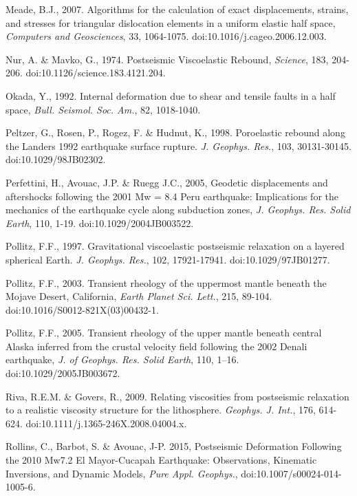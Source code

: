 \documentclass[extra,mreferee]{gji}
\begin{document}
\begin{thebibliography}{}
 Meade, B.J., 2007. Algorithms for the
  calculation of exact displacements, strains, and stresses for
  triangular dislocation elements in a uniform elastic half space,
  \textit{Computers and Geosciences}, 33,
  1064-1075. doi:10.1016/j.cageo.2006.12.003.

 Nur, A. \& Mavko, G.,
  1974. Postseismic Viscoelastic Rebound, \textit{Science}, 183,
  204-206. doi:10.1126/science.183.4121.204.

 Okada, Y., 1992. Internal
  deformation due to shear and tensile faults in a half space,
  \textit{Bull. Seismol. Soc.  Am.}, 82, 1018-1040.

 Peltzer, G., Rosen, P.,
  Rogez, F. \& Hudnut, K., 1998. Poroelastic rebound along the Landers
  1992 earthquake surface rupture. \textit{J. Geophys. Res.}, 103,
  30131-30145. doi:10.1029/98JB02302.

 Perfettini, H., Avouac,
  J.P. \& Ruegg J.C., 2005, Geodetic displacements and aftershocks
  following the 2001 Mw = 8.4 Peru earthquake: Implications for the
  mechanics of the earthquake cycle along subduction zones,
  \textit{J. Geophys.  Res. Solid Earth}, 110,
  1-19. doi:10.1029/2004JB003522.

 Pollitz, F.F.,
  1997. Gravitational viscoelastic postseismic relaxation on a layered
  spherical Earth. \textit{J. Geophys. Res.}, 102,
  17921-17941. doi:10.1029/97JB01277.

 Pollitz, F.F., 2003. Transient
  rheology of the uppermost mantle beneath the Mojave Desert,
  California, \textit{Earth Planet Sci. Lett.}, 215,
  89-104. doi:10.1016/S0012-821X(03)00432-1.

Pollitz, F.F., 2005. Transient
  rheology of the upper mantle beneath central Alaska inferred from
  the crustal velocity field following the 2002 Denali earthquake,
  \textit{J. of Geophys. Res. Solid Earth}, 110,
  1–16. doi:10.1029/2005JB003672.

 Riva, R.E.M. \&
  Govers, R., 2009. Relating viscosities from postseismic relaxation
  to a realistic viscosity structure for the
  lithosphere. \textit{Geophys. J.  Int.}, 176,
  614-624. doi:10.1111/j.1365-246X.2008.04004.x.

 Rollins, C., Barbot,
  S. \& Avouac, J-P. 2015, Postseismic Deformation Following the 2010
  Mw7.2 El Mayor-Cucapah Earthquake: Observations, Kinematic
  Inversions, and Dynamic Models, \textit{Pure Appl. Geophys.},
  doi:10.1007/s00024-014-1005-6.


\end{thebibliography}
\end{document}

